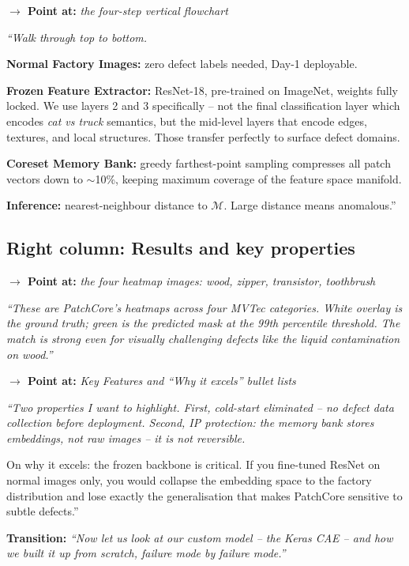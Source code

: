 \documentclass[12pt, a4paper]{article}
\newcommand{\say}[1]{%
  \begin{mdframed}[style=saybox]
  \itshape ``#1''
  \end{mdframed}
}
\newcommand{\pointer}[1]{\noindent\textbf{\color{teal}$\rightarrow$ Point at:} \textit{#1}\\[2pt]}
\newcommand{\transition}[1]{\vspace{4pt}\noindent\textbf{\color{accent}Transition:} \textit{``#1''}\vspace{4pt}}
\begin{document}
\pointer{the four-step vertical flowchart}

\say{Walk through top to bottom.

\textbf{Normal Factory Images:} zero defect labels needed, Day-1 deployable.

\textbf{Frozen Feature Extractor:} ResNet-18, pre-trained on ImageNet, weights fully locked. We use layers 2 and 3 specifically -- not the final classification layer which encodes \textit{cat vs truck} semantics, but the mid-level layers that encode edges, textures, and local structures. Those transfer perfectly to surface defect domains.

\textbf{Coreset Memory Bank:} greedy farthest-point sampling compresses all patch vectors down to $\sim$10\%, keeping maximum coverage of the feature space manifold.

\textbf{Inference:} nearest-neighbour distance to $\mathcal{M}$. Large distance means anomalous.}

\subsection{Right column: Results and key properties}

\pointer{the four heatmap images: wood, zipper, transistor, toothbrush}

\say{These are PatchCore's heatmaps across four MVTec categories. White overlay is the ground truth; green is the predicted mask at the 99th percentile threshold. The match is strong even for visually challenging defects like the liquid contamination on wood.}

\pointer{Key Features and ``Why it excels'' bullet lists}

\say{Two properties I want to highlight. First, cold-start eliminated -- no defect data collection before deployment. Second, IP protection: the memory bank stores embeddings, not raw images -- it is not reversible.

On why it excels: the frozen backbone is critical. If you fine-tuned ResNet on normal images only, you would collapse the embedding space to the factory distribution and lose exactly the generalisation that makes PatchCore sensitive to subtle defects.}

\transition{Now let us look at our custom model -- the Keras CAE -- and how we built it up from scratch, failure mode by failure mode.}

\vspace{1em}
\end{document}
